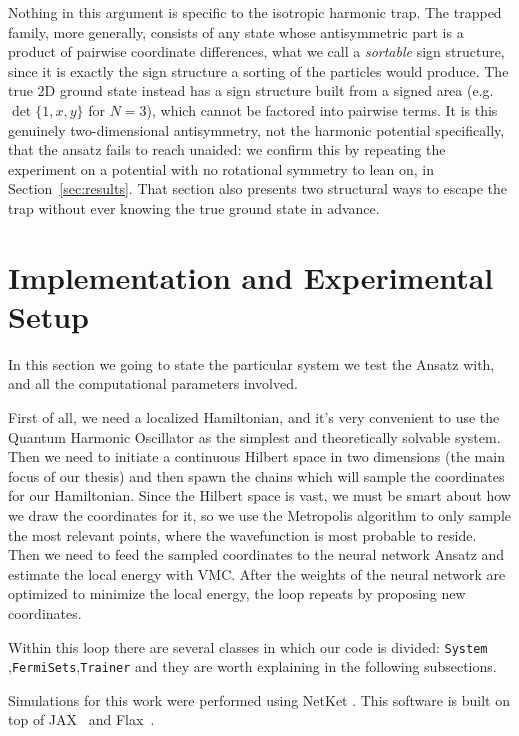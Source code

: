 \documentclass[a4paper,11pt,twoside]{article}
\begin{document}
Nothing in this argument is specific to the isotropic harmonic trap. The trapped family, more generally, consists of any state whose antisymmetric part is a product of pairwise coordinate differences, what we call a \textit{sortable} sign structure, since it is exactly the sign structure a sorting of the particles would produce. The true 2D ground state instead has a sign structure built from a signed area (e.g.\ $\det\{1,x,y\}$ for $N=3$), which cannot be factored into pairwise terms. It is this genuinely two-dimensional antisymmetry, not the harmonic potential specifically, that the ansatz fails to reach unaided: we confirm this by repeating the experiment on a potential with no rotational symmetry to lean on, in Section~\ref{sec:results}. That section also presents two structural ways to escape the trap without ever knowing the true ground state in advance.

\newpage



\section{Implementation and Experimental Setup}

In this section we going to state the particular system we test the Ansatz with, and all the computational parameters involved. 

First of all, we need a localized Hamiltonian, and it's very convenient to use the Quantum Harmonic Oscillator as the simplest and theoretically solvable system. Then we need to initiate a continuous Hilbert space in two dimensions (the main focus of our thesis) and then spawn the chains which will sample the coordinates for our Hamiltonian. Since the Hilbert space is vast, we must be smart about how we draw the coordinates for it, so we use the Metropolis algorithm to only sample the most relevant points, where the wavefunction is most probable to reside. Then we need to feed the sampled coordinates to the neural network Ansatz and estimate the local energy with VMC. After the weights of the neural network are optimized to minimize the local energy, the loop repeats by proposing new coordinates. 

Within this loop there are several classes in which our code is divided: \texttt{System} ,\texttt{FermiSets},\texttt{Trainer} and they are worth explaining in the following subsections. 

Simulations for this work were performed using
NetKet \cite{carleo_netket_2019, vicentini_netket_2022}. This software is built on top of JAX~\cite{bradbury_jax_2018}
and Flax~\cite{heek_flax_2024}.
\end{document}
